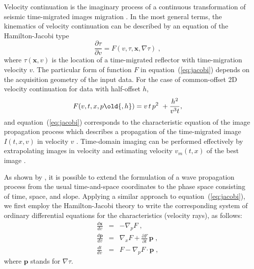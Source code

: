 Velocity continuation \cite[]{fomel2003velocity} is the imaginary
process of a continuous transformation of seismic time-migrated
images  migration . In the most general terms, the
kinematics of velocity continuation can be described by an equation of
the Hamilton-Jacobi type
\begin{equation}
\label{eq:jacobi}
\frac{\partial \tau}{\partial v} = F(v,\tau,\mathbf{x},\nabla \tau)\;,        
\end{equation}
where $\tau(\mathbf{x},v)$ is the location of a time-migrated
reflector with time-migration velocity $v$. The particular form
of function $F$ in equation~(\ref{eq:jacobi}) depends on the acquisition
geometry of the input data. For the case of common-offset 2D
velocity continuation for data with half-offset $h$, 
\begin{equation}
\label{eq:f2d}
F(v,t,x,p\old{,h})=v\,t\,p^2\ + \frac{h^2}{v^3t},
\end{equation}
and equation~(\ref{eq:jacobi}) corresponds to the characteristic
equation of the image propagation process which describes a propagation of the time-migrated image $I(t,x,v)$ in
velocity $v$ \cite[]{fomel2003velocity}. Time-domain imaging can be performed effectively by extrapolating
images in velocity and estimating velocity $v_m(t,x)$ of the best
image \cite[]{GEO52-05-06180643,GEO68-05-16621672,fomel14}.

As shown by \cite{SEG-2003-08930898}, it is possible to extend the
formulation of a wave propagation process from the usual
time-and-space coordinates to the phase space consisting of time,
space, and slope. Applying a similar approach to
equation~(\ref{eq:jacobi}), we first employ the Hamilton-Jacobi
theory \cite[]{courant,evans} to write the corresponding system of
ordinary differential equations for the characteristics (velocity
rays), as follows:
\begin{eqnarray}
\label{eq:dxdv}
\frac{d\mathbf{x}}{dv} & = & - \nabla_p F\;, \\
\label{eq:dpdv}
\frac{d\mathbf{p}}{dv} & = & \nabla_x F + \frac{\partial F}{\partial t}\,\mathbf{p}\;, \\
\label{eq:dtdv}
\frac{dt}{dv} & = & F - \nabla_p F \cdot \mathbf{p}\;, 
\end{eqnarray}
where $\mathbf{p}$ stands for $\nabla \tau$.

